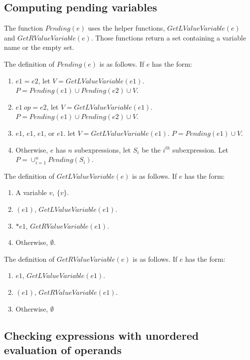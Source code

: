 \subsection{Computing pending variables}

The function $Pending(e)$ uses the helper functions,
$GetLValueVariable(e)$ and $GetRValueVariable(e)$.  Those functions
return a set containing a variable name or the empty set.

The definition of $Pending(e)$ is as follows. If $e$ has the form:
\begin{enumerate}
\item $e1 = e2$, let $V = GetLValueVariable(e1)$.
$P = Pending(e1) \cup Pending(e2) \cup V$.
\item$e1~op= e2$, let $V = GetLValueVariable(e1)$.
$P = Pending(e1) \cup Pending(e2) \cup V$.
\item \code{++}$e1$, \code{--}$e1$, $e1$\code{++}, or $e1$\code{--}.
let $V =  GetLValueVariable(e1)$.  $P = Pending(e1) \cup V$.
\item Otherwise, $e$ has $n$ subexpressions, let $S_i$ be
the $i^{th}$ subexpression.  Let $P = \cup_{i=1}^{n} Pending(S_i)$.
\end{enumerate}

The definition of $GetLValueVariable(e)$ is as follows. If $e$ has the form:
\begin{enumerate}
\item A variable $v$, $\{ v \}$.
\item $(e1)$, $GetLValueVariable(e1)$.
\item $*e1$, $GetRValueVariable(e1)$.
\item Otherwise, $\emptyset$.
\end{enumerate}

The definition of $GetRValueVariable(e)$ is as follows. If $e$ has the form:
\begin{enumerate}
\item \code{&}$e1$, $GetLValueVariable(e1)$.
\item$(e1)$, $GetRValueVariable(e1)$.
\item Otherwise, $\emptyset$
\end{enumerate}

\subsection{Checking expressions with unordered evaluation of operands}

